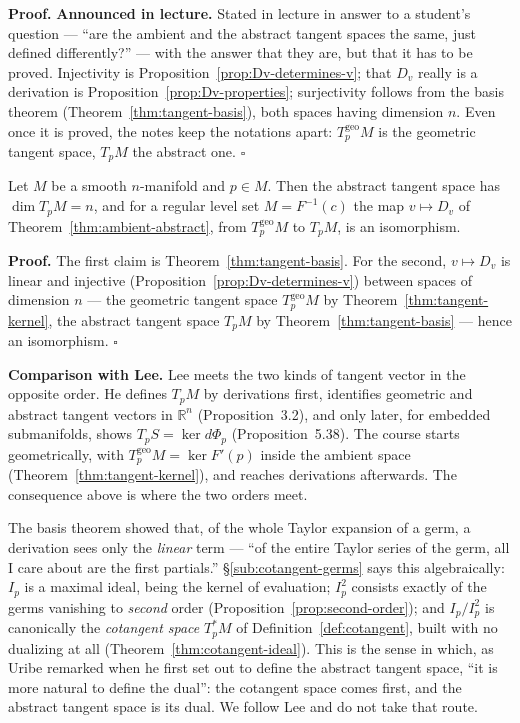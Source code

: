 \documentclass[11pt]{report}
\makeatletter
\newcounter{thmcounter}[section]
\renewenvironment{proof}[1][Proof]{\noindent\textbf{#1.} }{\hfill$\square$\par\vspace{5pt}}
\newcommand{\thmlabel}[1]{\edef\@currentlabel{\arabic{section}.\arabic{thmcounter}}\label{#1}}
\newcommand{\geo}{\mathrm{geo}}
\newcommand{\leeref}[1]{\par\smallskip{\raggedleft\footnotesize\textsc{Lee}:\ #1\par}}
\makeatother
\begin{document}
\begin{proof}[Proof]
\textbf{Announced in lecture.} Stated in lecture in answer to a student's question --- ``are the ambient and the abstract tangent spaces the same, just defined differently?'' --- with the answer that they are, but that it has to be proved. Injectivity is Proposition~\ref{prop:Dv-determines-v}; that $D_v$ really is a derivation is Proposition~\ref{prop:Dv-properties}; surjectivity follows from the basis theorem (Theorem~\ref{thm:tangent-basis}), both spaces having dimension $n$. Even once it is proved, the notes keep the notations apart: $T^{\geo}_pM$ is the geometric tangent space, $T_pM$ the abstract one.
\end{proof}
\begin{corbox}[Consequences]\thmlabel{cor:tangent-basis-consequences}
Let $M$ be a smooth $n$-manifold and $p \in M$. Then the abstract tangent space has $\dim T_pM = n$, and for a regular level set $M = F^{-1}(c)$ the map $v \mapsto D_v$ of Theorem~\ref{thm:ambient-abstract}, from $T^{\geo}_pM$ to $T_pM$, is an isomorphism.
\leeref{Proposition 3.10}
\end{corbox}

\begin{proof}
The first claim is Theorem~\ref{thm:tangent-basis}. For the second, $v \mapsto D_v$ is linear and injective (Proposition~\ref{prop:Dv-determines-v}) between spaces of dimension $n$ --- the geometric tangent space $T^{\geo}_pM$ by Theorem~\ref{thm:tangent-kernel}, the abstract tangent space $T_pM$ by Theorem~\ref{thm:tangent-basis} --- hence an isomorphism.
\end{proof}

\textbf{Comparison with Lee.} Lee meets the two kinds of tangent vector in the opposite order. He defines $T_pM$ by derivations first, identifies geometric and abstract tangent vectors in $\mathbb{R}^n$ (Proposition~3.2), and only later, for embedded submanifolds, shows $T_pS = \ker d\Phi_p$ (Proposition~5.38). The course starts geometrically, with $T^{\geo}_pM = \ker F'(p)$ inside the ambient space (Theorem~\ref{thm:tangent-kernel}), and reaches derivations afterwards. The consequence above is where the two orders meet.

\begin{rembox}\label{rem:derivation-sees-only-first-derivatives}
The basis theorem showed that, of the whole Taylor expansion of a germ, a derivation sees only the \emph{linear} term --- ``of the entire Taylor series of the germ, all I care about are the first partials.'' \S\ref{sub:cotangent-germs} says this algebraically: $I_p$ is a maximal ideal, being the kernel of evaluation; $I_p^2$ consists exactly of the germs vanishing to \emph{second} order (Proposition~\ref{prop:second-order}); and $I_p/I_p^2$ is canonically the \emph{cotangent space} $T_p^*M$ of Definition~\ref{def:cotangent}, built with no dualizing at all (Theorem~\ref{thm:cotangent-ideal}). This is the sense in which, as Uribe remarked when he first set out to define the abstract tangent space, ``it is more natural to define the dual'': the cotangent space comes first, and the abstract tangent space is its dual. We follow Lee and do not take that route.
\end{rembox}
\end{document}
